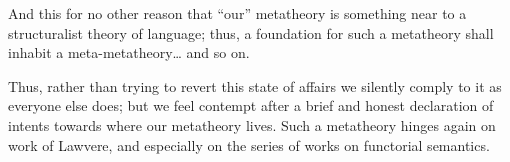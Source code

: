 And this for no other reason that ``our'' metatheory is something near to a structuralist theory of language; thus, a foundation for such a metatheory shall inhabit a meta-metatheory\dots{} and so on.

Thus, rather than trying to revert this state of affairs we silently comply to it as everyone else does; but we feel contempt after a brief and honest declaration of intents towards where our metatheory lives. Such a metatheory hinges again on work of Lawvere, and especially on the series of works on functorial semantics.